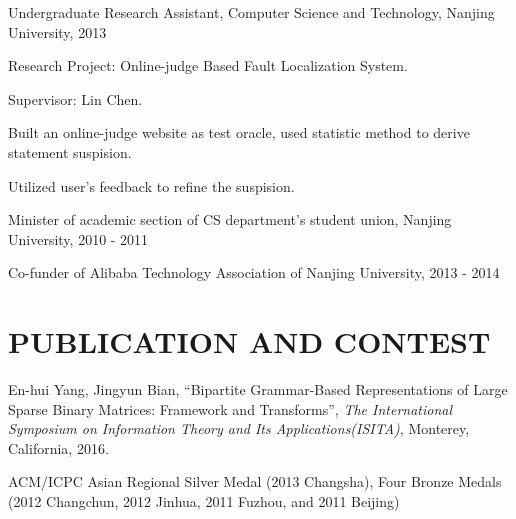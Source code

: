 \documentclass{res}
\newcommand{\parsp}{\vspace{-0.7\baselineskip}}
\newcommand{\additemindent}{\addtolength{\itemindent}{1em}}
\begin{document}
\begin{resume}
\begin{asparaitem}
	\item Undergraduate Research Assistant, Computer Science and Technology, Nanjing University, 2013
		\begin{asparaitem}
			\additemindent
			\item Research Project: Online-judge Based Fault Localization System.
			\item Supervisor: Lin Chen.
			\item Built an online-judge website as test oracle, used statistic method to derive statement suspision.
			\item Utilized user's feedback to refine the suspision.
		\end{asparaitem}
	
	\item Minister of academic section of CS department's student union, Nanjing University, 2010 - 2011
	\item Co-funder of Alibaba Technology Association of Nanjing University, 2013 - 2014
\end{asparaitem}



\parsp
\section{PUBLICATION AND CONTEST}
	\begin{asparaitem}
		\item En-hui Yang, Jingyun Bian, 
		``Bipartite Grammar-Based Representations of Large Sparse Binary Matrices: Framework and Transforms'', 
		\emph{The International Symposium on Information Theory and Its Applications(ISITA)}, 
		Monterey, California, 
		2016.
		\item ACM/ICPC Asian Regional Silver Medal (2013 Changsha), Four Bronze Medals (2012 Changchun, 2012 Jinhua, 2011 Fuzhou, and 2011 Beijing)
	\end{asparaitem}


\parsp

\end{resume}
\end{document}
